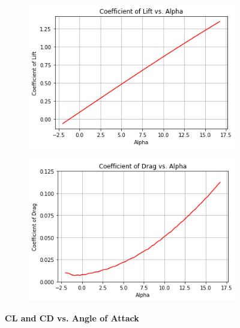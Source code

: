     \begin{figure}[h]
        \centering
        \begin{subfigure}{.5\textwidth}
          \centering
          \includegraphics[width=1\linewidth]{homeworks/homework4/analysis/CL vs AoA.png}
          \label{fig:CL vs. AoA}
        \end{subfigure}%
        \begin{subfigure}{.5\textwidth}
          \centering
          \includegraphics[width=1\linewidth]{homeworks/homework4/analysis/CD vs AoA.png}
          \label{fig:CD vs. AoA}
        \end{subfigure}
        \caption{\textbf{CL and CD vs. Angle of Attack}}
    \end{figure}
    
